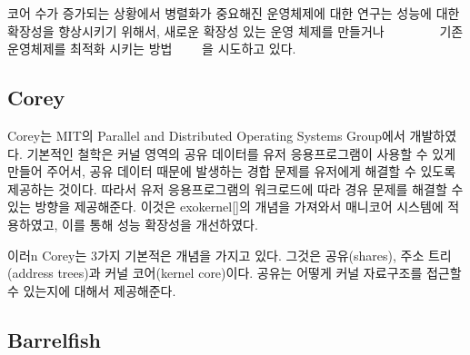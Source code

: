 코어 수가 증가되는 상황에서 병렬화가 중요해진 운영체제에 대한 연구는 성능에
 대한 확장성을 향상시키기 위해서, 새로운 확장성 있는
운영 체제를 만들거나 ~\cite{Boyd-WickizerCorey}~\cite{Wentzlaff2010fOS}
~\cite{Baumann2009Barrelfish}~\cite{Zellweger2014Multikernel}
~\cite{Liu2009Tessellation}~\cite{Farrington2010Helios} 
기존 운영체제를 최적화 시키는
방법~\cite{SilasBoydWickizer2010LinuxScales48}
~\cite{AustinTClements2012RCUBalancedTrees}~\cite{Clements2013RadixVM}~\cite{SilasBoydWickizerPth}을
시도하고 있다.



\subsection{Corey}

Corey는 MIT의 Parallel and Distributed Operating Systems Group에서 개발하였다. 
기본적인 철학은 커널 영역의 공유 데이터를 유저 응용프로그램이 사용할 수 있게 만들어 주어서, 
공유 데이터 때문에 발생하는 경합 문제를 유저에게 해결할 수 있도록 제공하는 것이다. 
따라서 유저 응용프로그램의 워크로드에 따라 경유 문제를 해결할 수 있는 방향을 제공해준다.
이것은 exokernel[]의 개념을 가져와서 매니코어 시스템에 적용하였고, 이를 통해 성능 확장성을 개선하였다.

이러n Corey는 3가지 기본적은 개념을 가지고 있다. 그것은 공유(shares), 주소 트리(address trees)과 커널
코어(kernel core)이다.
공유는 어떻게 커널 자료구조를 접근할 수 있는지에 대해서 제공해준다.


\subsection{Barrelfish}

